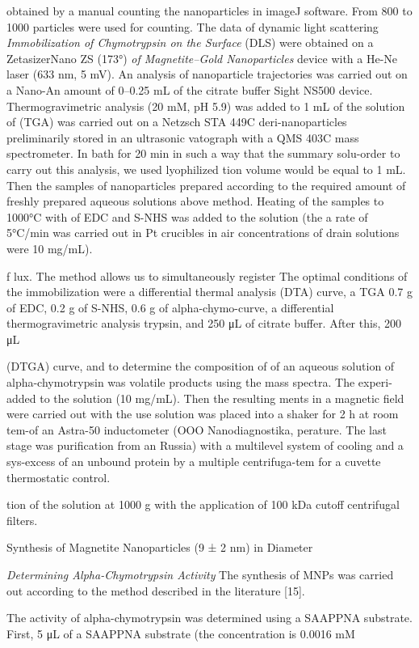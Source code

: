 \documentclass[12pt,a4paper]{article}
\begin{document}
obtained by a manual counting the nanoparticles in imageJ software. From
800 to 1000 particles were used for counting. The data of dynamic light
scattering \emph{Immobilization of Chymotrypsin on the Surface} (DLS)
were obtained on a ZetasizerNano ZS (173°) \emph{of Magnetite--Gold
Nanoparticles} device with a He-Ne laser (633 nm, 5 mV). An analysis of
nanoparticle trajectories was carried out on a Nano-An amount of 0--0.25
mL of the citrate buffer Sight NS500 device. Thermogravimetric analysis
(20 mM, pH 5.9) was added to 1 mL of the solution of (TGA) was carried
out on a Netzsch STA 449C deri-nanoparticles preliminarily stored in an
ultrasonic vatograph with a QMS 403C mass spectrometer. In bath for 20
min in such a way that the summary solu-order to carry out this
analysis, we used lyophilized tion volume would be equal to 1 mL. Then
the samples of nanoparticles prepared according to the required amount
of freshly prepared aqueous solutions above method. Heating of the
samples to 1000°C with of EDC and S-NHS was added to the solution (the a
rate of 5°C/min was carried out in Pt crucibles in air concentrations of
drain solutions were 10 mg/mL).

f lux. The method allows us to simultaneously register The optimal
conditions of the immobilization were a differential thermal analysis
(DTA) curve, a TGA 0.7 g of EDC, 0.2 g of S-NHS, 0.6 g of
alpha-chymo-curve, a differential thermogravimetric analysis trypsin,
and 250 μL of citrate buffer. After this, 200 μL

(DTGA) curve, and to determine the composition of of an aqueous solution
of alpha-chymotrypsin was volatile products using the mass spectra. The
experi-added to the solution (10 mg/mL). Then the resulting ments in a
magnetic field were carried out with the use solution was placed into a
shaker for 2 h at room tem-of an Astra-50 inductometer (OOO
Nanodiagnostika, perature. The last stage was purification from an
Russia) with a multilevel system of cooling and a sys-excess of an
unbound protein by a multiple centrifuga-tem for a cuvette thermostatic
control.

tion of the solution at 1000 g with the application of 100 kDa cutoff
centrifugal filters.

Synthesis of Magnetite Nanoparticles (9 ± 2 nm) in Diameter

\emph{Determining Alpha-Chymotrypsin Activity} The synthesis of MNPs was
carried out according to the method described in the literature
{[}15{]}.

The activity of alpha-chymotrypsin was determined using a SAAPPNA
substrate. First, 5 μL of a SAAPPNA substrate (the concentration is
0.0016 mM
\end{document}
